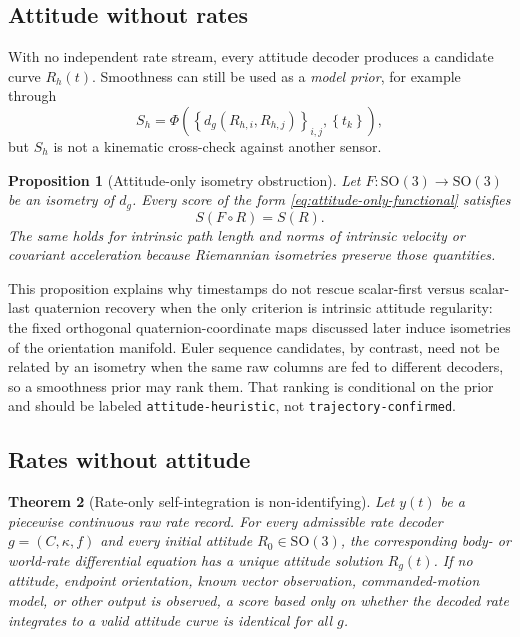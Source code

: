 \documentclass[11pt]{article}
\newtheorem{theorem}{Theorem}
\newtheorem{proposition}[theorem]{Proposition}
\newcommand{\SO}{\mathrm{SO}(3)}
\newcommand{\set}[1]{\left\{ #1 \right\}}
\begin{document}
    \subsection{Attitude without rates}

    With no independent rate stream, every attitude decoder produces a candidate curve
    $R_h(t)$. Smoothness can still be used as a \emph{model prior}, for example through
    \begin{equation}
        S_h=\Phi\!\left(
                      \set{d_g(R_{h,i},R_{h,j})}_{i,j},
                      \set{t_k}
        \right),
        \label{eq:attitude-only-functional}
    \end{equation}
    but $S_h$ is not a kinematic cross-check against another sensor.

    \begin{proposition}[Attitude-only isometry obstruction]
Let $F:\SO\rightarrow\SO$ be an isometry of $d_g$. Every score of the form
\eqref{eq:attitude-only-functional} satisfies
\begin{equation}
    S(F\circ R)=S(R).
\end{equation}
The same holds for intrinsic path length and norms of intrinsic velocity or covariant
acceleration because Riemannian isometries preserve those quantities.
    \end{proposition}

    This proposition explains why timestamps do not rescue scalar-first versus scalar-last
    quaternion recovery when the only criterion is intrinsic attitude regularity: the fixed
    orthogonal quaternion-coordinate maps discussed later induce isometries of the
    orientation manifold. Euler sequence candidates, by contrast, need not be related by an
    isometry when the same raw columns are fed to different decoders, so a smoothness prior
    may rank them. That ranking is conditional on the prior and should be labeled
    \texttt{attitude-heuristic}, not \texttt{trajectory-confirmed}.

    \subsection{Rates without attitude}

    \begin{theorem}[Rate-only self-integration is non-identifying]
Let $y(t)$ be a piecewise continuous raw rate record. For every admissible rate decoder
$g=(C,\kappa,f)$ and every initial attitude $R_0\in\SO$, the corresponding body- or
world-rate differential equation has a unique attitude solution $R_g(t)$. If no attitude,
endpoint orientation, known vector observation, commanded-motion model, or other output
is observed, a score based only on whether the decoded rate integrates to a valid
attitude curve is identical for all $g$.
    \end{theorem}
\end{document}

